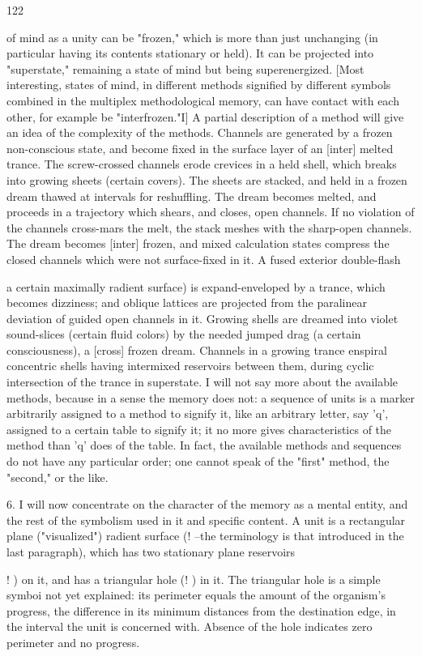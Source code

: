 \documentclass[10pt,twoside]{memoir}
\begin{document}
\begin{enumerate}
{{{{{{{{{{{{{{122 


of mind as a unity can be "frozen," which is more than just unchanging (in 
particular having its contents stationary or held). It can be projected into 
"superstate," remaining a state of mind but being superenergized. [Most 
interesting, states of mind, in different methods signified by different 
symbols combined in the multiplex methodological memory, can have 
contact with each other, for example be "interfrozen."I] A partial description 
of a method will give an idea of the complexity of the methods. Channels are 
generated by a frozen non-conscious state, and become fixed in the surface 
layer of an [inter] melted trance. The screw-crossed channels erode crevices 
in a held shell, which breaks into growing sheets (certain covers). The sheets 
are stacked, and held in a frozen dream thawed at intervals for reshuffling. 
The dream becomes melted, and proceeds in a trajectory which shears, and 
closes, open channels. If no violation of the channels cross-mars the melt, the 
stack meshes with the sharp-open channels. The dream becomes [inter] 
frozen, and mixed calculation states compress the closed channels which 
were not surface-fixed in it. A fused exterior double-flash {a certain 
maximally radient surface) is expand-enveloped by a trance, which becomes 
dizziness; and oblique lattices are projected from the paralinear deviation of 
guided open channels in it. Growing shells are dreamed into violet 
sound-slices (certain fluid colors) by the needed jumped drag (a certain 
consciousness), a [cross] frozen dream. Channels in a growing trance enspiral 
concentric shells having intermixed reservoirs between them, during cyclic 
intersection of the trance in superstate. I will not say more about the 
available methods, because in a sense the memory does not: a sequence of 
units is a marker arbitrarily assigned to a method to signify it, like an 
arbitrary letter, say 'q', assigned to a certain table to signify it; it no more 
gives characteristics of the method than 'q' does of the table. In fact, the 
available methods and sequences do not have any particular order; one 
cannot speak of the "first" method, the "second," or the like. 


6. I will now concentrate on the character of the memory as a mental 
entity, and the rest of the symbolism used in it and specific content. A unit 
is a rectangular plane ("visualized") radient surface (! --the terminology is 
that introduced in the last paragraph), which has two stationary plane 
reservoirs {! ) on it, and has a triangular hole (! ) in it. The triangular hole is 
a simple symboi not yet explained: its perimeter equals the amount of the 
organism's progress, the difference in its minimum distances from the 
destination edge, in the interval the unit is concerned with. Absence of the 
hole indicates zero perimeter and no progress. 

}}}}}}}}}}}}}}}}
\end{enumerate}
\end{document}

